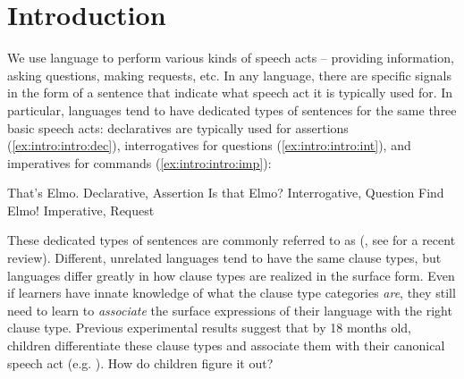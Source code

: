 

\chapter{Introduction}
\label{chap:introduction}
We use language to perform various kinds of speech acts -- providing information, asking questions, making requests, etc. In any language, there are specific signals in the form of a sentence that indicate what speech act it is typically used for. In particular, languages tend to have dedicated types of sentences for the same three basic speech acts: declaratives are typically used for assertions (\ref{ex:intro:intro:dec}), interrogatives for questions (\ref{ex:intro:intro:int}), and imperatives for commands (\ref{ex:intro:intro:imp}):

\bxl \label{ex:intro:intro:dec}
That's Elmo. \hfill Declarative, Assertion
\ex\label{ex:intro:intro:int} Is that Elmo? \hfill Interrogative, Question
\ex\label{ex:intro:intro:imp} Find Elmo! \hfill Imperative, Request
\exl
\eex


These dedicated types of sentences are commonly referred to as  (\citealt{sz1985speechact, konig2007, aikhenvald2016, portner2018}, see \cite{konig2020} for a recent review). Different, unrelated languages tend to have the same clause types, but languages differ greatly in how clause types are realized in the surface form. Even if learners have innate knowledge of what the clause type categories \emph{are}, they still need to learn to \emph{associate} the surface expressions of their language with the right clause type. Previous experimental results suggest that by 18 months old, children differentiate these clause types and associate them with their canonical speech act (e.g. \cite{casillas2017turn,marshmallowqueen}). How do children figure it out? %

